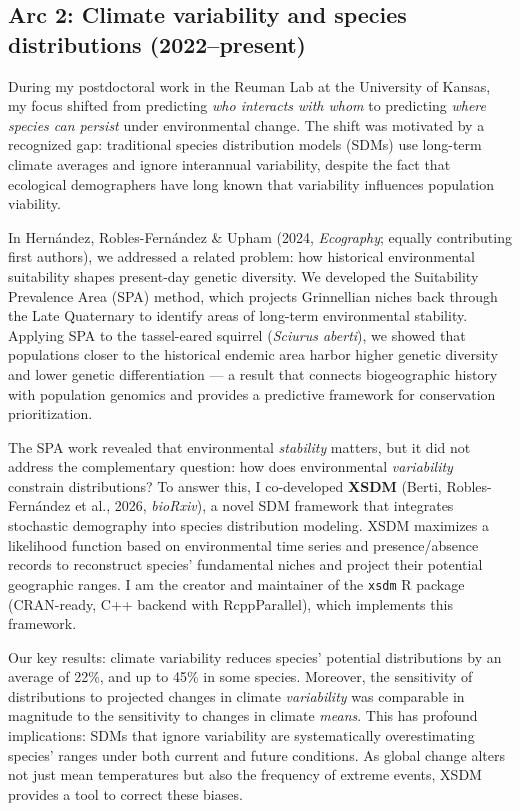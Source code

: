 \documentclass[11pt,letterpaper]{article}
\begin{document}
\subsection*{Arc 2: Climate variability and species distributions
(2022--present)}\label{arc-2-climate-variability-and-species-distributions-2022present}

During my postdoctoral work in the Reuman Lab at the University of
Kansas, my focus shifted from predicting \emph{who interacts with whom}
to predicting \emph{where species can persist} under environmental
change. The shift was motivated by a recognized gap: traditional species
distribution models (SDMs) use long-term climate averages and ignore
interannual variability, despite the fact that ecological demographers
have long known that variability influences population viability.

In Hernández, Robles-Fernández \& Upham (2024, \emph{Ecography}; equally
contributing first authors), we addressed a related problem: how
historical environmental suitability shapes present-day genetic
diversity. We developed the Suitability Prevalence Area (SPA) method,
which projects Grinnellian niches back through the Late Quaternary to
identify areas of long-term environmental stability. Applying SPA to the
tassel-eared squirrel (\emph{Sciurus aberti}), we showed that
populations closer to the historical endemic area harbor higher genetic
diversity and lower genetic differentiation --- a result that connects
biogeographic history with population genomics and provides a predictive
framework for conservation prioritization.

The SPA work revealed that environmental \emph{stability} matters, but
it did not address the complementary question: how does environmental
\emph{variability} constrain distributions? To answer this, I
co-developed \textbf{XSDM} (Berti, Robles-Fernández et al., 2026,
\emph{bioRxiv}), a novel SDM framework that integrates stochastic
demography into species distribution modeling. XSDM maximizes a
likelihood function based on environmental time series and
presence/absence records to reconstruct species' fundamental niches and
project their potential geographic ranges. I am the creator and
maintainer of the \texttt{xsdm} R package (CRAN-ready, C++ backend with
RcppParallel), which implements this framework.

Our key results: climate variability reduces species' potential
distributions by an average of 22\%, and up to 45\% in some species.
Moreover, the sensitivity of distributions to projected changes in
climate \emph{variability} was comparable in magnitude to the
sensitivity to changes in climate \emph{means}. This has profound
implications: SDMs that ignore variability are systematically
overestimating species' ranges under both current and future conditions.
As global change alters not just mean temperatures but also the
frequency of extreme events, XSDM provides a tool to correct these
biases.
\end{document}
